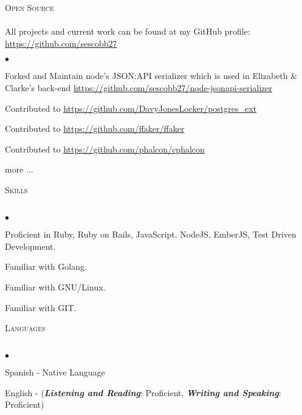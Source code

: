\documentclass[a4paper]{article}
\newcommand{\lineunder}{\vspace*{-8pt} \\ \hspace*{-18pt} \hrulefill \\}
\newcommand{\header}[1]{{\hspace*{-15pt}\vspace*{6pt}
\textsc{#1}} \vspace*{-6pt} \lineunder}
\newenvironment{achievements}{\begin{list}{$\bullet$}{\topsep 0pt \itemsep
-2pt}}{\vspace*{4pt}\end{list}}
\newcommand{\programming}[1]{{\textbf{#1}}}
\newcommand{\emphasys}[1]{\textbf{\emph{#1}}}
\begin{document}

\header{Open Source}
All projects and current work can be found at my GitHub profile: \url{https://github.com/sescobb27}
\begin{achievements}
\item{Forked and Maintain node's JSON:API serializer which is used in Elizabeth \& Clarke's back-end \url{https://github.com/sescobb27/node-jsonapi-serializer}}
\item{Contributed to \url{https://github.com/DavyJonesLocker/postgres_ext}}
\item{Contributed to \url{https://github.com/ffaker/ffaker}}
\item{Contributed to \url{https://github.com/phalcon/cphalcon}}
\item{more ...}
\end{achievements}

\header{Skills}
\begin{achievements}
\item {Proficient in Ruby, Ruby on Rails, JavaScript, NodeJS, EmberJS, Test Driven Development.}
\item {Familiar with Golang.}
\item {Familiar with GNU/Linux.}
\item {Familiar with GIT.}
\end{achievements}
\header{Languages}
\begin{achievements}
\item{Spanish - Native Language}
\item{English - (\emphasys{Listening and Reading}: Proficient, \emphasys{Writing and Speaking}: Proficient)}
\end{achievements}
\end{document}
